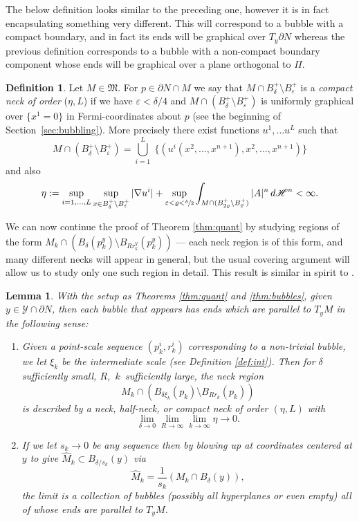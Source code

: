\documentclass[JEP,XML,SOM,Unicode]{cedram}
\let\mathcal\mathscr
\newtheorem{lem}[thm]{Lemma}
\theoremstyle{definition}
\newtheorem{definition}[thm]{Definition}
\newcommand{\h}{\mathscr{H}}
\let\D\nabla
\let\eps\varepsilon
\begin{document}
The below definition looks similar to the preceding one, however it is in fact encapsulating something very different. This will correspond to a bubble with a compact boundary, and in fact its ends will be graphical over $T_y \partial N$ whereas the previous definition corresponds to a bubble with a non-compact boundary component whose ends will be graphical over a plane orthogonal to $\Pi$.

\begin{definition}\label{neckdef_c_boundary}
Let $M\in \mathfrak{M}$. For $p\in \partial N\cap M$ we say that $M\cap B^{+}_\delta\setminus B^{+}_{\eps}$ is a \emph{compact neck of order} ($\eta, L$) if we have $\eps < \delta/4$ and $M\cap (B_\delta^+\setminus B_{\eps}^+)$ is uniformly graphical over $\{x^{1}=0\}$ in Fermi-coordinates about $p$ (see the beginning of Section~\ref{sec:bubbling}). More precisely there exist functions $u^1,\dots u^L$ such that
\begin{equation*}
M\cap (B_\delta^+ \setminus B_{\eps}^+) = \bigcup_{i=1}^L \; \{(u^i(x^2,\dots,x^{n+1}),x^2,\dots ,x^{n+1})\}
\end{equation*}
and also
\begin{equation}
\eta:=\sup_{i=1,\ldots,L} \sup_{x\in B^+_\delta \setminus B^+_{\eps}} |\D u^i | + \sup_{\eps< \varrho < \sfrac{\delta}{2}} \int_{M \cap (B^+_{2\varrho}\setminus B^+_\varrho)} |A|^n \, d\h^n< \infty.
\end{equation}
\end{definition}

We can now continue the proof of Theorem \ref{thm:quant} by studying regions of the form $M_k\cap (B_{\delta}(p^y_k)\setminus B_{R r^y_k}(p^y_k))$ --- each neck region is of this form, and many different necks will appear in general, but the usual covering argument will allow us to study only one such region in detail. This result is similar in spirit to \cite[Th.\,1.1]{W15}.

\begin{lem}\label{lem:thm1}
With the setup as Theorems \ref{thm:quant} and \ref{thm:bubbles}, given $y\in \mathcal{Y}\cap\partial N$, then each bubble that appears has ends which are parallel to $T_y M$ in the following sense:
\begin{enumerate}
\item{Given a point-scale sequence $(p^i_k, r^i_k)$ corresponding to a non-trivial bubble, we let $\xi_k$ be the intermediate scale (see Definition \ref{def:int}).
Then for $\delta$ sufficiently small, $R$,~$k$~sufficiently large, the neck region $$M_k\cap (B_{\delta \xi_k}(p_k)\setminus B_{R r_k}(p_k))$$ is described by a neck, half-neck, or compact neck of order $(\eta, L)$ with
$$\lim_{\delta \to 0}\lim_{R\to \infty} \lim_{k\to \infty} \eta \to 0.$$}
\item{If we let $s_k\to 0$ be any sequence then by blowing up at coordinates centered at $y$ to give $\widehat{M}_k \subset B_{\delta/s_k}(y)$ via
$$\widehat{M}_k = \frac{1}{s_k}(M_k\cap B_{\delta}(y)),$$
the limit is a collection of bubbles (possibly all hyperplanes or even empty) all of whose ends are parallel to $T_y M$. }
\end{enumerate}
\end{lem}
\end{document}
